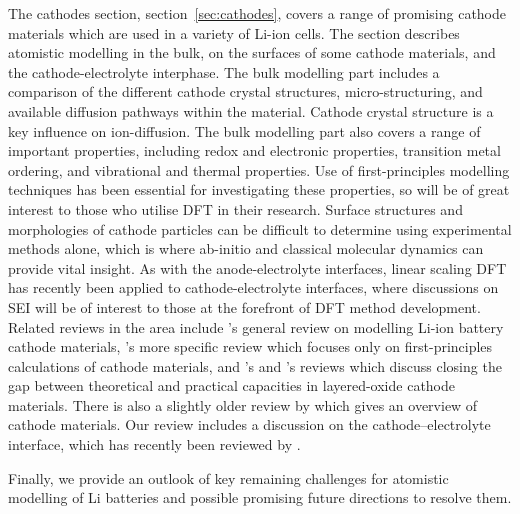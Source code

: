 \documentclass[../main.tex]{subfiles}
\begin{document}
The cathodes section, section~\ref{sec:cathodes}, covers a range of promising cathode materials which are used in a variety of Li-ion cells. The section describes atomistic modelling in the bulk, on the surfaces of some cathode materials, and the cathode-electrolyte interphase. The bulk modelling part includes a comparison of the different cathode crystal structures, micro-structuring, and available diffusion pathways within the material. Cathode crystal structure is a key influence on ion-diffusion. The bulk modelling part also covers a range of important properties, including redox and electronic properties, transition metal ordering, and vibrational and thermal properties. Use of first-principles modelling techniques has been essential for investigating these properties, so will be of great interest to those who utilise DFT in their research. Surface structures and morphologies of cathode particles can be difficult to determine using experimental methods alone, which is where ab-initio and classical molecular dynamics can provide vital insight. As with the anode-electrolyte interfaces, linear scaling DFT has recently been applied to cathode-electrolyte interfaces, where discussions on SEI will be of interest to those at the forefront of DFT method development. Related reviews in the area include \citeauthor{ma2018computer}'s \cite{ma2018computer} general review on modelling Li-ion battery cathode materials, \citeauthor{yan2014review}'s \cite{yan2014review} more specific review which focuses only on first-principles calculations of cathode materials, and \citeauthor{radin2017narrowing}'s \cite{radin2017narrowing} and \citeauthor{wang2018reviving}'s \cite{wang2018reviving} reviews which discuss closing the gap between theoretical and practical capacities in layered-oxide cathode materials. There is also a slightly older review by \citeauthor{daniel2014cathode} \cite{daniel2014cathode} which gives an overview of cathode materials. Our review includes a discussion on the cathode--electrolyte interface, which has recently been reviewed by \citeauthor{maleki2019controllable} \cite{maleki2019controllable}.

Finally, we provide an outlook of key remaining challenges for atomistic modelling of Li batteries and possible promising future directions to resolve them.
\end{document}
